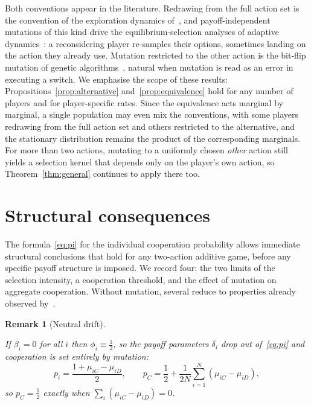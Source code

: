 \documentclass[11pt]{article}
\newtheorem{remark}{Remark}
\newcommand{\pC}{p_C}
\begin{document}
Both conventions appear in the literature. Redrawing from the full action
set is the convention of the exploration dynamics
of~\cite{traulsen2009exploration}, and payoff-independent mutations of this
kind drive the equilibrium-selection analyses of adaptive
dynamics~\cite{kandori1993learning}: a reconsidering player re-samples their
options, sometimes landing on the action they already use. Mutation
restricted to the other action is the bit-flip mutation of genetic
algorithms~\cite{holland1992adaptation,goldberg1989genetic}, natural when
mutation is read as an error in executing a switch. We emphasise the scope
of these results: Propositions~\ref{prop:alternative}
and~\ref{prop:equivalence} hold for any number of players and for
player-specific rates. Since the equivalence acts marginal by marginal, a
single population may even mix the conventions, with some players redrawing
from the full action set and others restricted to the alternative, and the
stationary distribution remains the product of the corresponding marginals.
For more than two actions, mutating to a uniformly chosen \emph{other}
action still yields a selection kernel that depends only on the player's
own action, so Theorem~\ref{thm:general} continues to apply there too.

\section{Structural consequences}\label{sec:consequences}

The formula~\eqref{eq:pi} for the individual cooperation probability allows immediate
structural conclusions that hold for any two-action additive game, before any
specific payoff
structure is imposed. We record four: the two limits of the selection intensity, a
cooperation threshold, and the effect of mutation on aggregate cooperation. Without
mutation, several reduce to properties already observed
by~\cite{couto2023multiplayer}.

\begin{remark}[Neutral drift]\label{rem:neutral}

If \(\beta_i=0\) for all \(i\) then \(\phi_i\equiv\tfrac{1}{2}\), so the payoff
parameters
\(\delta_i\) drop out of~\eqref{eq:pi} and cooperation is set entirely by mutation:
\[
  p_i = \frac{1+\mu_{iC}-\mu_{iD}}{2}, \qquad
  \pC = \frac{1}{2}+\frac{1}{2N}\sum_{i=1}^{N}(\mu_{iC}-\mu_{iD}),
\]
so \(\pC=\tfrac{1}{2}\) exactly when \(\sum_i(\mu_{iC}-\mu_{iD})=0\).

\end{remark}
\end{document}
